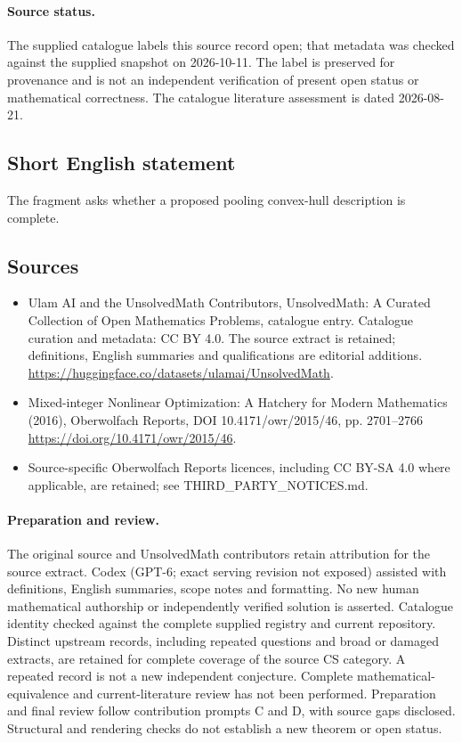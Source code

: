 \documentclass[11pt]{article}
\begin{document}
\paragraph{Source status.}
The supplied catalogue labels this source record open; that metadata was checked against the supplied snapshot on 2026-10-11. The label is preserved for provenance and is not an independent verification of present open status or mathematical correctness. The catalogue literature assessment is dated 2026-08-21.
\subsection{Short English statement}
The fragment asks whether a proposed pooling convex-hull description is complete.
\subsection{Sources}
\begin{itemize}
\item[\hypertarget{source:statement:1}{S1}] Ulam AI and the UnsolvedMath Contributors, UnsolvedMath: A Curated Collection of Open Mathematics Problems, catalogue entry. Catalogue curation and metadata: CC BY 4.0. The source extract is retained; definitions, English summaries and qualifications are editorial additions.
\url{https://huggingface.co/datasets/ulamai/UnsolvedMath}.
\item[\hypertarget{source:statement:2}{S2}] Mixed-integer Nonlinear Optimization: A Hatchery for Modern Mathematics (2016), Oberwolfach Reports, DOI 10.4171/owr/2015/46, pp. 2701--2766
\url{https://doi.org/10.4171/owr/2015/46}.
\item Source-specific Oberwolfach Reports licences, including CC BY-SA 4.0 where applicable, are retained; see THIRD\_PARTY\_NOTICES.md.
\end{itemize}
\paragraph{Preparation and review.}
The original source and UnsolvedMath contributors retain attribution for the source extract. Codex (GPT-6; exact serving revision not exposed) assisted with definitions, English summaries, scope notes and formatting. No new human mathematical authorship or independently verified solution is asserted. Catalogue identity checked against the complete supplied registry and current repository. Distinct upstream records, including repeated questions and broad or damaged extracts, are retained for complete coverage of the source CS category. A repeated record is not a new independent conjecture. Complete mathematical-equivalence and current-literature review has not been performed. Preparation and final review follow contribution prompts C and D, with source gaps disclosed. Structural and rendering checks do not establish a new theorem or open status.
\label{end:statement}
\end{document}
